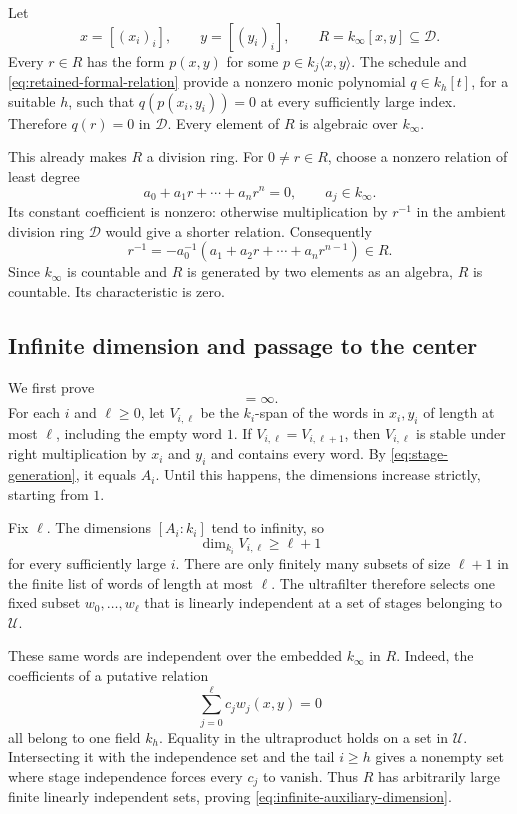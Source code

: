 \documentclass[11pt]{article}
\theoremstyle{definition}
\theoremstyle{remark}
\numberwithin{equation}{section}
\begin{document}
Let
\[
 x=[(x_i)_i],\qquad y=[(y_i)_i],\qquad
 R=k_\infty[x,y]\subseteq\mathcal D.
\]
Every $r\in R$ has the form $p(x,y)$ for some
$p\in k_j\langle x,y\rangle$.  The schedule and
\eqref{eq:retained-formal-relation} provide a nonzero monic polynomial
$q\in k_h[t]$, for a suitable $h$, such that
$q(p(x_i,y_i))=0$ at every sufficiently large index.  Therefore
$q(r)=0$ in $\mathcal D$.  Every element of $R$ is algebraic over
$k_\infty$.

This already makes $R$ a division ring.  For $0\ne r\in R$, choose a
nonzero relation of least degree
\[
 a_0+a_1r+\cdots+a_nr^n=0,
 \qquad a_j\in k_\infty.
\]
Its constant coefficient is nonzero: otherwise multiplication by
$r^{-1}$ in the ambient division ring $\mathcal D$ would give a shorter
relation.  Consequently
\[
 r^{-1}=-a_0^{-1}(a_1+a_2r+\cdots+a_nr^{n-1})\in R.
\]
Since $k_\infty$ is countable and $R$ is generated by two elements as an
algebra, $R$ is countable.  Its characteristic is zero.

\subsection{Infinite dimension and passage to the center}

We first prove
\begin{equation}
 [R:k_\infty]=\infty.
 \label{eq:infinite-auxiliary-dimension}
\end{equation}
For each $i$ and $\ell\geq0$, let $V_{i,\ell}$ be the $k_i$-span of the
words in $x_i,y_i$ of length at most $\ell$, including the empty word
$1$.  If $V_{i,\ell}=V_{i,\ell+1}$, then $V_{i,\ell}$ is stable under
right multiplication by $x_i$ and $y_i$ and contains every word.
By \eqref{eq:stage-generation}, it equals $A_i$.  Until this happens,
the dimensions increase strictly, starting from $1$.

Fix $\ell$.  The dimensions $[A_i:k_i]$ tend to infinity, so
\[
 \dim_{k_i}V_{i,\ell}\geq\ell+1
\]
for every sufficiently large $i$.  There are only finitely many
subsets of size $\ell+1$ in the finite list of words of length at most
$\ell$.  The ultrafilter therefore selects one fixed subset
$w_0,\ldots,w_\ell$ that is linearly independent at a set of stages
belonging to $\mathcal U$.

These same words are independent over the embedded $k_\infty$ in $R$.
Indeed, the coefficients of a putative relation
\[
 \sum_{j=0}^{\ell} c_j w_j(x,y)=0
\]
all belong to one field $k_h$.  Equality in the ultraproduct holds on
a set in $\mathcal U$.  Intersecting it with the independence set and
the tail $i\geq h$ gives a nonempty set where stage independence
forces every $c_j$ to vanish.  Thus $R$ has arbitrarily large finite
linearly independent sets, proving
\eqref{eq:infinite-auxiliary-dimension}.
\end{document}
